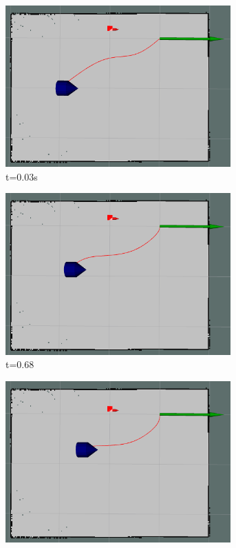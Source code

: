 \begin{figure}[ht]
    \centering
    \begin{subfigure}[b]{0.30\linewidth}
        \centering
        \includegraphics[width=0.95\textwidth]{images/spline_single_1_obs/1/5003.png}
        \caption{t=0.03s}
    \end{subfigure}%
    \begin{subfigure}[b]{0.30\linewidth}
        \centering
        \includegraphics[width=0.95\textwidth]{images/spline_single_1_obs/1/5068.png}
        \caption{t=0.68}
    \end{subfigure}%
    \begin{subfigure}[b]{0.30\linewidth}
        \centering
        \includegraphics[width=0.95\textwidth]{images/spline_single_1_obs/1/5126.png}

\end{subfigure}
\end{figure}
